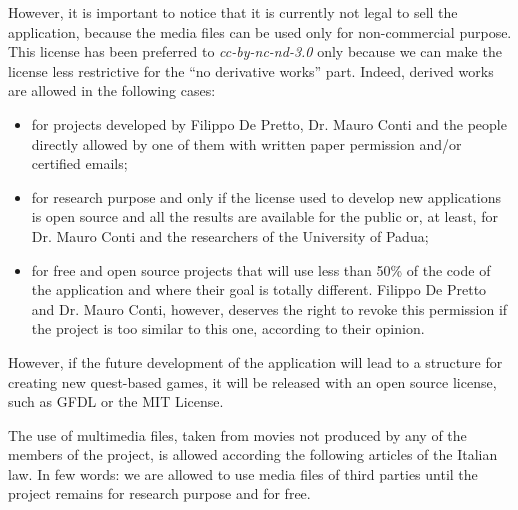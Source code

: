 However, it is important to notice that it is currently not legal to sell the application, because the media files can be used only for non-commercial purpose. This license has been preferred to \textit{cc-by-nc-nd-3.0} only because we can make the license less restrictive for the ``no derivative works'' part. Indeed, derived works are allowed in the following cases:
\begin{itemize}
\item for projects developed by Filippo De Pretto, Dr. Mauro Conti and the people directly allowed by one of them with written paper permission and/or certified emails;
\item for research purpose and only if the license used to develop new applications is open source and all the results are available for the public or, at least, for Dr. Mauro Conti and the researchers of the University of Padua;
\item for free and open source projects that will use less than 50\% of the code of the application and where their goal is totally different. Filippo De Pretto and Dr. Mauro Conti, however, deserves the right to revoke this permission if the project is too similar to this one, according to their opinion.
\end{itemize}

However, if the future development of the application will lead to a structure for creating new quest-based games, it will be released with an open source license, such as GFDL or the MIT License. 

The use of multimedia files, taken from movies not produced by any of the members of the project, is allowed according the following articles of the Italian law. In few words: we are allowed to use media files of third parties until the project remains for research purpose and for free.

